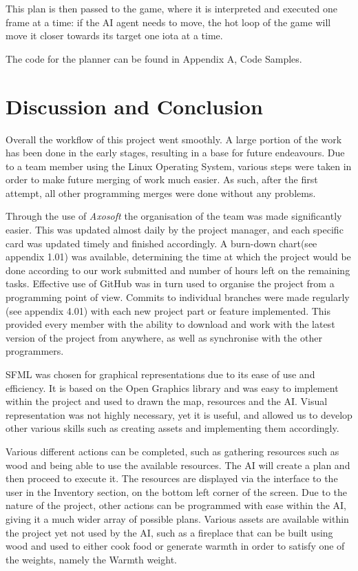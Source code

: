 \documentclass[a4paper]{report}
\begin{document}
This plan is then passed to the game, where it is interpreted and executed one frame at a time: if the AI agent needs to move, the hot loop of the game will move it closer towards its target one iota at a time.

The code for the planner can be found in Appendix A, Code Samples.

\chapter{Discussion and Conclusion}
Overall the workflow of this project went smoothly. A large portion of the work has been done in the early stages, resulting in a base for future endeavours. Due to a team member using the Linux Operating System, various steps were taken in order to make future merging of work much easier. As such, after the first attempt, all other programming merges were done without any problems. 

Through the use of \textit{Axosoft} the organisation of the team was made significantly easier. This was updated almost daily by the project manager, and each specific card was updated timely and finished accordingly. A burn-down chart(see appendix 1.01) was available, determining the time at which the project would be done according to our work submitted and number of hours left on the remaining tasks. Effective use of GitHub was in turn used to organise the project from a programming point of view. Commits to individual branches were made regularly (see appendix 4.01) with each new project part or feature implemented. This provided every member with the ability to download and work with the latest version of the project from anywhere, as well as synchronise with the other programmers.

SFML was chosen for graphical representations due to its ease of use and efficiency. It is based on the Open Graphics library and was easy to implement within the project and used to drawn the map, resources and the AI. Visual representation was not highly necessary, yet it is useful, and allowed us to develop other various skills such as creating assets and implementing them accordingly.

Various different actions can be completed, such as gathering resources such as wood and being able to use the available resources. The AI will create a plan and then proceed to execute it. The resources are displayed via the interface to the user in the Inventory section, on the bottom left corner of the screen. Due to the nature of the project, other actions can be programmed with ease within the AI, giving it a much wider array of possible plans. Various assets are available within the project yet not used by the AI, such as a fireplace that can be built using wood and used to either cook food or generate warmth in order to satisfy one of the weights, namely the Warmth weight.
\end{document}
